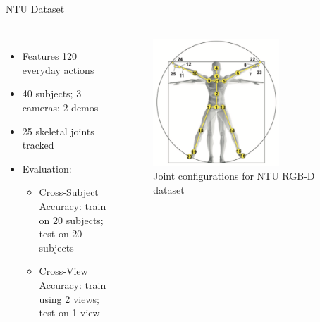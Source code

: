 \documentclass[aspectratio=169, xcolor=dvipsnames]{beamer}
\begin{document}
\begin{frame}{NTU Dataset}
      \framesubtitle{}%
      
      \vspace{-0.75cm}
      \begin{columns}
      \begin{itemize}
            \item Features 120 everyday actions
            \item 40 subjects; 3 cameras; 2 demos
            \item 25 skeletal joints tracked
            \item Evaluation:
            \begin{itemize}
                  \item Cross-Subject Accuracy: train on 20 subjects; test on 20 subjects
                  \item Cross-View Accuracy: train using 2 views; test on 1 view
            \end{itemize}
      \end{itemize}
      
      \begin{figure}[ht!]
            \centering
            \includegraphics[width=0.7\textwidth]{images/joint_config.pdf}
            \caption{Joint configurations for NTU RGB-D dataset\footnotemark}
      \end{figure}      
      \end{columns}
\end{frame}
\end{document}
